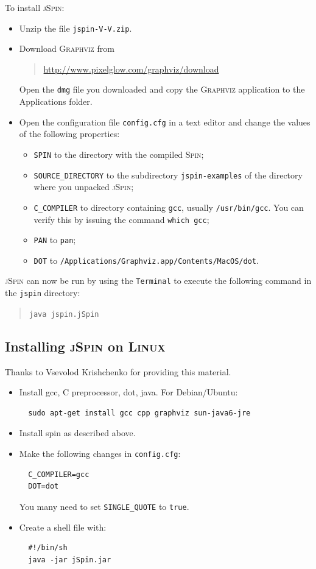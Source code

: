 \documentclass[11pt]{article}
\newcommand{\spn}{\textsc{Spin}}
\newcommand{\js}{\textsc{jSpin}}
\newcommand{\p}[1]{\texttt{#1}}
\begin{document}
To install \js{}:
\begin{itemize}
\item Unzip the file \p{jspin-V-V.zip}.
\item Download \textsc{Graphviz} from
\begin{quote}
\url{http://www.pixelglow.com/graphviz/download}
\end{quote}
Open the \p{dmg} file you downloaded and copy the \textsc{Graphviz}
application to the Applications folder.
\item Open the configuration file \p{config.cfg} in a text editor and change the
values of the following properties: 
\begin{itemize}
\item \p{SPIN} to the directory with the compiled \spn{};
\item \p{SOURCE\_DIRECTORY} to the subdirectory \p{jspin-examples} of the directory
where you unpacked \js{};
\item \p{C\_COMPILER} to directory containing \p{gcc},
usually \p{/usr/bin/gcc}. You can verify this by issuing the command \p{which gcc};
\item \p{PAN} to \p{pan};
\item \p{DOT} to \p{/Applications/Graphviz.app/Contents/MacOS/dot}.
\end{itemize}
\end{itemize}

\js{} can now be run by using the \p{Terminal} to execute the following command
in the \p{jspin} directory:
\begin{quote}
\p{java jspin.jSpin} 
\end{quote}

\subsection{Installing \js{} on \textsc{Linux}}\label{a.linux}

Thanks to Vsevolod Krishchenko for providing this material.

\begin{itemize}

\item Install gcc, C preprocessor, dot, java. For Debian/Ubuntu:
\begin{verbatim}
  sudo apt-get install gcc cpp graphviz sun-java6-jre
\end{verbatim}
\item Install spin as described above.
\item Make the following changes in \p{config.cfg}:
\begin{verbatim}
  C_COMPILER=gcc
  DOT=dot
\end{verbatim}
You many need to set \p{SINGLE\_QUOTE} to \p{true}.
\item Create a shell file with:
\begin{verbatim}
  #!/bin/sh
  java -jar jSpin.jar
\end{verbatim}
\end{itemize}
\end{document}
